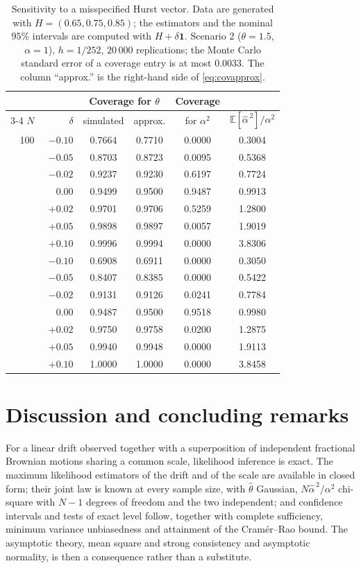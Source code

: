 \documentclass[11pt,reqno]{amsart}
\numberwithin{equation}{section}
\theoremstyle{plain}
\theoremstyle{definition}
\theoremstyle{remark}
\newcommand{\bone}{\mathbf{1}}
\newcommand{\E}{\mathbb{E}}
\begin{document}
\begin{table}[htbp]
\caption{Sensitivity to a misspecified Hurst vector. Data are generated with
$H=(0.65,0.75,0.85)$; the estimators and the nominal $95\%$ intervals are computed with
$H+\delta\bone$. Scenario 2 ($\theta=1.5$, $\alpha=1$), $h=1/252$, $20\,000$
replications; the Monte Carlo standard error of a coverage entry is at most $0.0033$.
The column ``approx.'' is the right-hand side of \eqref{eq:covapprox}.}
\label{ta:misspec}
\small
\begin{tabular}{@{}rrcccc@{}}
\toprule
 & & \multicolumn{2}{c}{Coverage for $\theta$}
   & Coverage & \\
\cmidrule(lr){3-4}
$N$ & $\delta$ & simulated & approx. & for $\alpha^{2}$
    & $\E[\widehat\alpha^{\,2}]/\alpha^{2}$\\
\midrule
100 & $-0.10$ & 0.7664 & 0.7710 & 0.0000 & 0.3004\\
    & $-0.05$ & 0.8703 & 0.8723 & 0.0095 & 0.5368\\
    & $-0.02$ & 0.9237 & 0.9230 & 0.6197 & 0.7724\\
    & $\phantom{-}0.00$ & 0.9499 & 0.9500 & 0.9487 & 0.9913\\
    & $+0.02$ & 0.9701 & 0.9706 & 0.5259 & 1.2800\\
    & $+0.05$ & 0.9898 & 0.9897 & 0.0057 & 1.9019\\
    & $+0.10$ & 0.9996 & 0.9994 & 0.0000 & 3.8306\\
\addlinespace
500 & $-0.10$ & 0.6908 & 0.6911 & 0.0000 & 0.3050\\
    & $-0.05$ & 0.8407 & 0.8385 & 0.0000 & 0.5422\\
    & $-0.02$ & 0.9131 & 0.9126 & 0.0241 & 0.7784\\
    & $\phantom{-}0.00$ & 0.9487 & 0.9500 & 0.9518 & 0.9980\\
    & $+0.02$ & 0.9750 & 0.9758 & 0.0200 & 1.2875\\
    & $+0.05$ & 0.9940 & 0.9948 & 0.0000 & 1.9113\\
    & $+0.10$ & 1.0000 & 1.0000 & 0.0000 & 3.8458\\
\bottomrule
\end{tabular}
\end{table}

\section{Discussion and concluding remarks}\label{se:disc}

For a linear drift observed together with a superposition of independent fractional
Brownian motions sharing a common scale, likelihood inference is exact. The maximum
likelihood estimators of the drift and of the scale are available in closed form; their
joint law is known at every sample size, with $\widehat\theta$ Gaussian,
$N\widehat\alpha^{\,2}/\alpha^{2}$ chi-square with $N-1$ degrees of freedom and the two
independent; and confidence intervals and tests of exact level follow, together with
complete sufficiency, minimum variance unbiasedness and attainment of the Cram\'er--Rao
bound. The asymptotic theory, mean square and strong consistency and asymptotic
normality, is then a consequence rather than a substitute.
\end{document}
